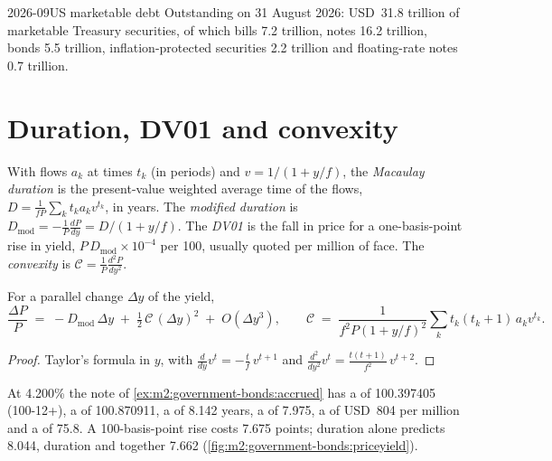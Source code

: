 \begin{dated}{2026-09}{US marketable debt}\label{dat:m2:government-bonds:debt}
Outstanding on 31 August 2026: USD~31.8 trillion of marketable Treasury
securities, of which bills 7.2 trillion, notes 16.2 trillion, bonds 5.5
trillion, inflation-protected securities 2.2 trillion and floating-rate notes
0.7 trillion.
\end{dated}

\section{Duration, DV01 and convexity}

\begin{definition}\label{def:m2:government-bonds:duration}
With flows $a_k$ at times $t_k$ (in periods) and $v = 1/(1 + y/f)$, the
\emph{Macaulay duration} is the present-value
weighted average time of the flows, $D = \frac{1}{f P}\sum_k t_k a_k v^{t_k}$,
in years. The \emph{modified duration} is
$D_{\mathrm{mod}} = -\frac1P \frac{dP}{dy} = D/(1 + y/f)$. The
\emph{DV01} is the fall in price for a one-basis-point rise in
yield, $P\,D_{\mathrm{mod}} \times 10^{-4}$ per 100, usually quoted per million
of face. The \emph{convexity} is $\mathcal C = \frac1P
\frac{d^2P}{dy^2}$.
\end{definition}

\begin{proposition}\label{prop:m2:government-bonds:taylor}
For a parallel change $\Delta y$ of the yield,
\[
\frac{\Delta P}{P} \;=\; -D_{\mathrm{mod}}\,\Delta y \;+\; \tfrac12\,\mathcal C\,(\Delta y)^2 \;+\; O(\Delta y^3),
\qquad
\mathcal C \;=\; \frac{1}{f^2 P (1+y/f)^2}\sum_k t_k(t_k+1)\,a_k v^{t_k} .
\]
\end{proposition}
\begin{proof}
Taylor's formula in $y$, with $\frac{d}{dy} v^{t} = -\frac{t}{f}\,v^{t+1}$ and
$\frac{d^2}{dy^2} v^t = \frac{t(t+1)}{f^2}\, v^{t+2}$.
\end{proof}

\begin{example}\label{ex:m2:government-bonds:risk}
At 4.200\% the note of \cref{ex:m2:government-bonds:accrued} has a 
of 100.397405 (100-12+), a  of 100.870911, a  of
8.142 years, a  of 7.975, a  of USD~804 per million and a
 of 75.8. A 100-basis-point rise costs 7.675 points; duration alone
predicts 8.044, duration and  together 7.662
(\cref{fig:m2:government-bonds:priceyield}).
\end{example}

